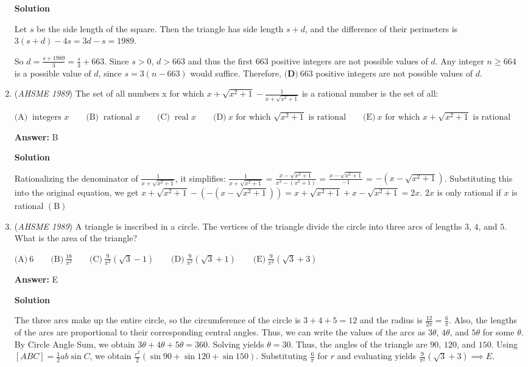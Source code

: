 \begin{enumerate}
\textbf{Solution}

Let $s$ be the side length of the square.  Then the triangle has side length $s + d$, and the difference of their perimeters is $3(s + d) - 4s = 3d - s = 1989$.  

 So $d = \frac{s + 1989}{3} = \frac{s}{3} + 663$.  Since $s > 0$, $d > 663$ and thus the first $663$ positive integers are not possible values of $d$.  Any integer $n \geq 664$ is a possible value of $d$, since $s = 3(n - 663)$ would suffice.  Therefore, $\boxed{\textbf{(D)}\ 663}$ positive integers are not possible values of $d$.

 


	\item (\textit{AHSME 1989}) The set of all numbers x for which $x+\sqrt{x^{2}+1}-\frac{1}{x+\sqrt{x^{2}+1}}$ is a rational number is the set of all:


 $\textrm{(A)}\ \text{ integers }x\qquad\textrm{(B)}\ \text{ rational }x\qquad\textrm{(C)}\ \text{ real }x\qquad\textrm{(D)}\ x\text{ for which }\sqrt{x^{2}+1}\text{ is rational}\qquad\textrm{(E)}\ x\text{ for which }x+\sqrt{x^{2}+1}\text{ is rational }$

 \textbf{Answer: }B



\textbf{Solution}

Rationalizing the denominator of $\frac{1}{x+\sqrt{x^2+1}}$, it simplifies: $\frac{1}{x+\sqrt{x^2+1}}$ = $\frac{x-\sqrt{x^2+1}}{x^2-(x^2+1)}$ = $\frac{x-\sqrt{x^2+1}}{-1}$ = $-(x-\sqrt{x^2+1})$. Substituting this into the original equation, we get $x + \sqrt{x^2+1} - (-(x-\sqrt{x^2+1})) = x+\sqrt{x^2+1} + x - \sqrt{x^2+1} = 2x$. $2x$ is only rational if $x$ is rational $\mathrm{(B)}$



	\item (\textit{AHSME 1989}) A triangle is inscribed in a circle. The vertices of the triangle divide the circle into three arcs of lengths $3$, $4$, and $5$. What is the area of the triangle?


 $\textrm{(A)}\ 6\qquad\textrm{(B)}\ \frac{18}{\pi^{2}}\qquad\textrm{(C)}\ \frac{9}{\pi^{2}}\left(\sqrt{3}-1\right)\qquad\textrm{(D)}\ \frac{9}{\pi^{2}}\left(\sqrt{3}+1\right)\qquad\textrm{(E)}\ \frac{9}{\pi^{2}}\left(\sqrt{3}+3\right)$

 \textbf{Answer: }E



\textbf{Solution}

The three arcs make up the entire circle, so the circumference of the circle is $3+4+5=12$ and the radius is $\frac{12}{2\pi}=\frac{6}{\pi}$. Also, the lengths of the arcs are proportional to their corresponding central angles. Thus, we can write the values of the arcs as $3\theta$, $4\theta$, and $5\theta$ for some $\theta$. By Circle Angle Sum, we obtain $3\theta+4\theta+5\theta=360$. Solving yields $\theta=30$. Thus, the angles of the triangle are $90$, $120$, and $150$. Using $[ABC]=\frac{1}{2}ab\sin{C}$, we obtain $\frac{r^2}{2}(\sin{90}+\sin{120}+\sin{150})$. Substituting $\frac{6}{\pi}$ for $r$ and evaluating yields $\frac{9}{\pi^2}(\sqrt{3}+3)\implies{\boxed{E}}$.


\end{enumerate}
